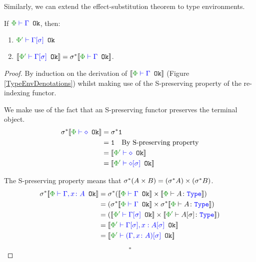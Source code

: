 \documentclass{Report}
\begin{document}
Similarly, we can extend the effect-substitution theorem to type environments.

\begin{framed}
    \begin{theorem}\label{EffectSubstitutionOnTypeEnvs}
        If $\wellformedok{\P}{\G}$, then:
        \begin{enumerate}[label=\roman*.]
            \item $\wellformedok{\P'}{\G\ssi}$
            \item $\deno{\wellformedok{\P'}{\G\ssi}} = \si\star\deno{\wellformedok{\P}{\G}}$.
        \end{enumerate}
         
    \end{theorem}
    
    \begin{proof}
        By induction on the derivation of $\deno{\wellformedok{\P}{\G}}$ (Figure \ref{TypeEnvDenotations}) whilst making use of the S-preserving property of the re-indexing functor.
    
        \case{\envnil}
        We make use of the fact that an S-preserving functor preserves the terminal object.
        \begin{align*}
            \si\star\deno{\wellformedok{\P}{\nil}} &=\si\star\1\\
            & = \1\qt{By S-preserving property}\\
            &= \deno{\wellformedok{\P'}{\nil}}\\
            &= \deno{\wellformedok{\P'}{\nil\ssi}}\\
        \end{align*}
        
        \case{\envextend}
        The S-preserving property means that $\sigma^*(A \times B) = (\sigma^* A)\times (\sigma^* B)$.
        \begin{align*}
           \si\star\deno{\wellformedok{\P}{\gax}} &= \si\star(\deno{\wellformedok{\P}{\G}} \times \deno{\typerelation{\P}{A}{\type}}) \\
           & = (\si\star\deno{\wellformedok{\P}{\G}} \times \si\star\deno{\typerelation{\P}{A}{\type}})\\
            & = (\deno{\wellformedok{\P'}{\G\ssi}} \times \deno{\typerelation{\P'}{A\ssi}{\type}})\\
            & = \deno{\wellformedok{\P'}{\G\ssi, x: A\ssi}}\\
            & = \deno{\wellformedok{\P'}{(\gax)\ssi}}\\
        \end{align*}
    
        $$\square$$
    \end{proof}
    
\end{framed}
\end{document}

